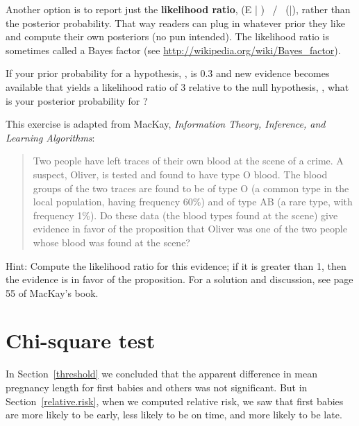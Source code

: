 \documentclass[12pt]{book}
\begin{document}
Another option is to report just the {\bf likelihood ratio}, \Prob(E
| \HH{}) ~/~ \Prob(\E|\HH{}), rather than the
posterior probability.  That way readers can plug in whatever prior
they like and compute their own posteriors (no pun intended).  The
likelihood ratio is sometimes called a Bayes factor (see
\url{http://wikipedia.org/wiki/Bayes_factor}).

\begin{exercise}
If your prior probability for a hypothesis, \HH{}, is 0.3 and new
evidence becomes available that yields a likelihood ratio of 3
relative to the null hypothesis, \HH{}, what is your posterior
probability for \HH{}?


\end{exercise}


\begin{exercise}
This exercise is adapted from MacKay, {\em Information
  Theory, Inference, and Learning Algorithms}:

\begin{quote}

Two people have left traces of their own blood at the scene of a
crime.  A suspect, Oliver, is tested and found to have type O blood.
The blood groups of the two traces are found to be of type O (a common
type in the local population, having frequency 60\%) and of type AB (a
rare type, with frequency 1\%).  Do these data (the blood types found
at the scene) give evidence in favor of the proposition that
Oliver was one of the two people whose blood was found at the scene?

\end{quote}

Hint: Compute the likelihood ratio for this evidence; if it is greater
than 1, then the evidence is in favor of the proposition.
For a solution and discussion, see page 55 of MacKay's book.

\end{exercise}


\section{Chi-square test}

In Section~\ref{threshold} we concluded that the apparent difference
in mean pregnancy length for first babies and others was not
significant.  But in Section~\ref{relative.risk}, when we computed
relative risk, we saw that first babies are more likely to be early,
less likely to be on time, and more likely to be late.
\end{document}
